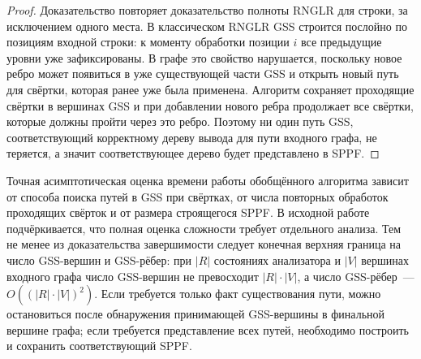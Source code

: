 \begin{proof}
    Доказательство повторяет доказательство полноты RNGLR для строки, за исключением одного места.
    В классическом RNGLR GSS строится послойно по позициям входной строки: к моменту обработки позиции $i$ все предыдущие уровни уже зафиксированы.
    В графе это свойство нарушается, поскольку новое ребро может появиться в уже существующей части GSS и открыть новый путь для свёртки, которая ранее уже была применена.
    Алгоритм сохраняет проходящие свёртки в вершинах GSS и при добавлении нового ребра продолжает все свёртки, которые должны пройти через это ребро.
    Поэтому ни один путь GSS, соответствующий корректному дереву вывода для пути входного графа, не теряется, а значит соответствующее дерево будет представлено в SPPF.
\end{proof}

Точная асимптотическая оценка времени работы обобщённого алгоритма зависит от способа поиска путей в GSS при свёртках, от числа повторных обработок проходящих свёрток и от размера строящегося SPPF.
В исходной работе подчёркивается, что полная оценка сложности требует отдельного анализа.
Тем не менее из доказательства завершимости следует конечная верхняя граница на число GSS-вершин и GSS-рёбер: при $|R|$ состояниях анализатора и $|V|$ вершинах входного графа число GSS-вершин не превосходит $|R| \cdot |V|$, а число GSS-рёбер~--- $O((|R| \cdot |V|)^2)$.
Если требуется только факт существования пути, можно остановиться после обнаружения принимающей GSS-вершины в финальной вершине графа; если требуется представление всех путей, необходимо построить и сохранить соответствующий SPPF.
